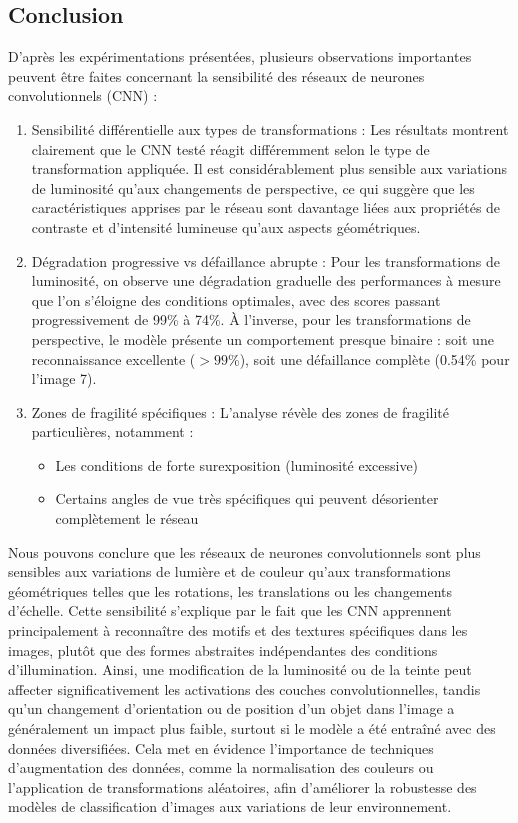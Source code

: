 \documentclass{article}
\begin{document}
\subsection{Conclusion}

D'après les expérimentations présentées, plusieurs observations importantes peuvent être faites concernant la sensibilité des réseaux de neurones convolutionnels (CNN) :

\begin{enumerate}
    \item Sensibilité différentielle aux types de transformations : Les résultats montrent clairement que le CNN testé réagit différemment selon le type de transformation appliquée. Il est considérablement plus sensible aux variations de luminosité qu'aux changements de perspective, ce qui suggère que les caractéristiques apprises par le réseau sont davantage liées aux propriétés de contraste et d'intensité lumineuse qu'aux aspects géométriques.
    \item Dégradation progressive vs défaillance abrupte : Pour les transformations de luminosité, on observe une dégradation graduelle des performances à mesure que l'on s'éloigne des conditions optimales, avec des scores passant progressivement de 99\% à 74\%. À l'inverse, pour les transformations de perspective, le modèle présente un comportement presque binaire : soit une reconnaissance excellente ($>99\%$), soit une défaillance complète (0.54\% pour l'image 7).
    \item Zones de fragilité spécifiques : L'analyse révèle des zones de fragilité particulières, notamment :
    \begin{itemize}
        \item Les conditions de forte surexposition (luminosité excessive)
        \item Certains angles de vue très spécifiques qui peuvent désorienter complètement le réseau
    \end{itemize}
\end{enumerate}

Nous pouvons conclure que les réseaux de neurones convolutionnels sont plus sensibles aux variations de lumière et de couleur qu'aux transformations géométriques telles que les rotations, les translations ou les changements d’échelle. Cette sensibilité s’explique par le fait que les CNN apprennent principalement à reconnaître des motifs et des textures spécifiques dans les images, plutôt que des formes abstraites indépendantes des conditions d’illumination. Ainsi, une modification de la luminosité ou de la teinte peut affecter significativement les activations des couches convolutionnelles, tandis qu’un changement d’orientation ou de position d’un objet dans l’image a généralement un impact plus faible, surtout si le modèle a été entraîné avec des données diversifiées. Cela met en évidence l'importance de techniques d'augmentation des données, comme la normalisation des couleurs ou l’application de transformations aléatoires, afin d’améliorer la robustesse des modèles de classification d’images aux variations de leur environnement.
\end{document}
